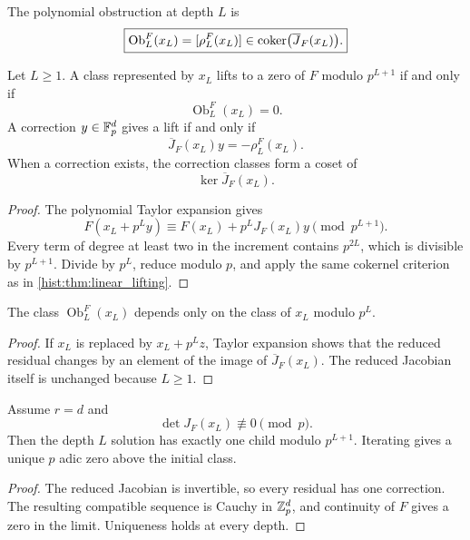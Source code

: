 \begin{histdefinition}\label{hist:def:polynomial_lift_obstruction}
The polynomial obstruction at depth \(L\) is
\[
\boxed{
\operatorname{Ob}^{F}_L(x_L)
=
[\rho_L^F(x_L)]
\in
\operatorname{coker}\bigl(\overline J_F(x_L)\bigr).
}
\]
\end{histdefinition}

\begin{histtheorem}\label{hist:thm:polynomial_lifting}
Let \(L\geq1\). A class represented by \(x_L\) lifts to a zero of \(F\) modulo \(p^{L+1}\) if and only if
\[
\boxed{
\operatorname{Ob}^{F}_L(x_L)=0.
}
\]
A correction \(y\in\mathbb F_p^d\) gives a lift if and only if
\[
\boxed{
\overline J_F(x_L)y
=
-\rho_L^F(x_L).
}
\]
When a correction exists, the correction classes form a coset of
\[
\ker\overline J_F(x_L).
\]
\end{histtheorem}

\begin{proof}
The polynomial Taylor expansion gives
\[
F(x_L+p^Ly)
\equiv
F(x_L)+p^LJ_F(x_L)y
\pmod {p^{L+1}}.
\]
Every term of degree at least two in the increment contains \(p^{2L}\), which is divisible by \(p^{L+1}\). Divide by \(p^L\), reduce modulo \(p\), and apply the same cokernel criterion as in \cref{hist:thm:linear_lifting}.
\end{proof}

\begin{histproposition}\label{hist:prop:polynomial_obstruction_independence}
The class \(\operatorname{Ob}^{F}_L(x_L)\) depends only on the class of \(x_L\) modulo \(p^L\).
\end{histproposition}

\begin{proof}
If \(x_L\) is replaced by \(x_L+p^Lz\), Taylor expansion shows that the reduced residual changes by an element of the image of \(\overline J_F(x_L)\). The reduced Jacobian itself is unchanged because \(L\geq1\).
\end{proof}

\begin{histcorollary}\label{hist:cor:simple_root_lifting}
Assume \(r=d\) and
\[
\det J_F(x_L)\not\equiv0\pmod p.
\]
Then the depth \(L\) solution has exactly one child modulo \(p^{L+1}\). Iterating gives a unique \(p\) adic zero above the initial class.
\end{histcorollary}

\begin{proof}
The reduced Jacobian is invertible, so every residual has one correction. The resulting compatible sequence is Cauchy in \(\mathbb Z_p^d\), and continuity of \(F\) gives a zero in the limit. Uniqueness holds at every depth.
\end{proof}

